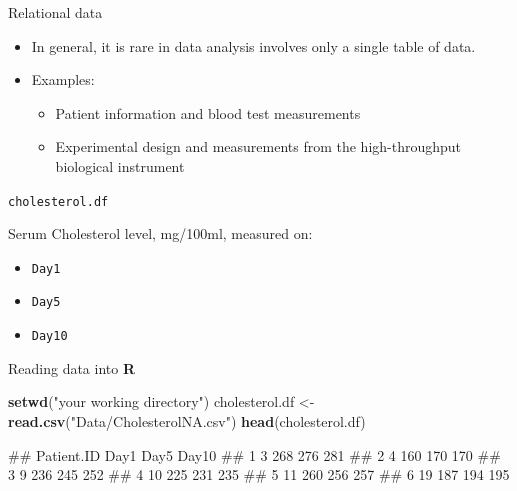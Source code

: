 \documentclass[ignorenonframetext,]{beamer}
\newenvironment{Shaded}{\begin{snugshade}}{\end{snugshade}}
\newcommand{\KeywordTok}[1]{\textcolor[rgb]{0.13,0.29,0.53}{\textbf{#1}}}
\newcommand{\StringTok}[1]{\textcolor[rgb]{0.31,0.60,0.02}{#1}}
\newcommand{\NormalTok}[1]{#1}
\providecommand{\tightlist}{%
  \setlength{\itemsep}{0pt}\setlength{\parskip}{0pt}}
\let\oldShaded\Shaded
\let\endoldShaded\endShaded
\renewenvironment{Shaded}{\footnotesize\oldShaded}{\endoldShaded}
\let\oldverbatim\verbatim
\let\endoldverbatim\endverbatim
\renewenvironment{verbatim}{\footnotesize\oldverbatim}{\endoldverbatim}
\begin{document}
\begin{frame}{Relational data}

\begin{itemize}
\item
  In general, it is rare in data analysis involves only a single table
  of data.
\item
  Examples:

  \begin{itemize}
  \tightlist
  \item
    Patient information and blood test measurements
  \item
    Experimental design and measurements from the high-throughput
    biological instrument
  \end{itemize}
\end{itemize}

\end{frame}

\begin{frame}[fragile]{\texttt{cholesterol.df}}

Serum Cholesterol level, mg/100ml, measured on:

\begin{itemize}
\tightlist
\item
  \texttt{Day1}
\item
  \texttt{Day5}
\item
  \texttt{Day10}
\end{itemize}

\end{frame}

\begin{frame}[fragile]{Reading data into \textbf{R}}

\begin{Shaded}
\begin{Highlighting}[]
\KeywordTok{setwd}\NormalTok{(}\StringTok{"your working directory"}\NormalTok{)}
\NormalTok{cholesterol.df <-}\StringTok{ }\KeywordTok{read.csv}\NormalTok{(}\StringTok{"Data/CholesterolNA.csv"}\NormalTok{)}
\KeywordTok{head}\NormalTok{(cholesterol.df)}
\end{Highlighting}
\end{Shaded}

\begin{verbatim}
##   Patient.ID Day1 Day5 Day10
## 1          3  268  276   281
## 2          4  160  170   170
## 3          9  236  245   252
## 4         10  225  231   235
## 5         11  260  256   257
## 6         19  187  194   195
\end{verbatim}

\end{frame}
\end{document}
